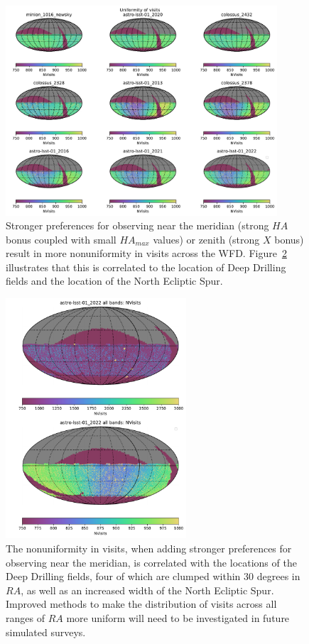 \documentclass[DM,lsstdraft,authoryear,toc]{lsstdoc}
\begin{document}
\begin{figure}[ht]
\centering
\includegraphics[width=0.9\textwidth]{figures/uniformity_of_visits}
\caption{Stronger preferences for observing near the meridian (strong $HA$ bonus coupled with small $HA_{max}$ values) or zenith (strong $X$ bonus) result in more nonuniformity in visits across the WFD. Figure~\ref{fig:uniformity_dd} illustrates that this is correlated to the location of Deep Drilling fields and the location of the North Ecliptic Spur.
\label{fig:uniformity_all}}
\end{figure}

\begin{figure}[ht]
\centering
\includegraphics[width=0.6\textwidth]{figures/uniformity_dd}
\caption{The nonuniformity in visits, when adding stronger preferences for observing near the meridian, is correlated with the locations of the Deep Drilling fields, four of which are clumped within 30 degrees in $RA$, as well as an increased width of the North Ecliptic Spur. Improved methods to make the distribution of visits across all ranges of $RA$ more uniform will need to be investigated in future simulated surveys. 
\label{fig:uniformity_dd}}
\end{figure}
\end{document}
